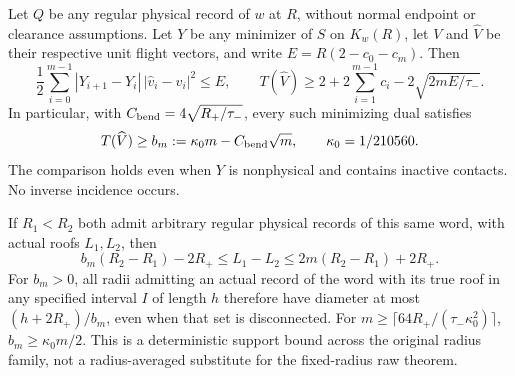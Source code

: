 \begin{theorem}
\label{thm:gv-all-record-bending}
Let $Q$ be any regular physical record of $w$ at $R$, without normal
endpoint or clearance assumptions. Let $Y$ be any minimizer of $S$
on $K_w(R)$, let $V$ and $\widehat V$ be their respective unit flight
vectors, and write $E=R(2-c_0-c_m)$. Then
\begin{equation}\label{eq:gv-velocity-energy}
 \frac12\sum_{i=0}^{m-1}|Y_{i+1}-Y_i|\,|\widehat v_i-v_i|^2\le E,
 \qquad
 T(\widehat V)\ge 2+2\sum_{i=1}^{m-1}c_i
                       -2\sqrt{2mE/\tau_-}.
\end{equation}
In particular, with $C_{\rm bend}=4\sqrt{R_+/\tau_-}$, every such
minimizing dual satisfies
\begin{equation}\label{eq:gv-minimum-bending}
 T(\widehat V)\ge b_m:=\kappa_0m-C_{\rm bend}\sqrt m,
 \qquad \kappa_0=1/210560.
\end{equation}
The comparison holds even when $Y$ is nonphysical and contains inactive
contacts. No inverse incidence occurs.

If $R_1<R_2$ both admit arbitrary regular physical records of this
same word, with actual roofs $L_1,L_2$, then
\begin{equation}\label{eq:gv-all-record-radius}
 b_m(R_2-R_1)-2R_+
       \le L_1-L_2
       \le 2m(R_2-R_1)+2R_+.
\end{equation}
For $b_m>0$, all radii admitting an actual record of the word with
its true roof in any specified interval $I$ of length $h$ therefore
have diameter at most $(h+2R_+)/b_m$, even when that set is disconnected.
For $m\ge\lceil64R_+/(\tau_-\kappa_0^2)\rceil$, $b_m\ge\kappa_0m/2$.
This is a deterministic support bound across the original radius family,
not a radius-averaged substitute for the fixed-radius raw theorem.
\end{theorem}

